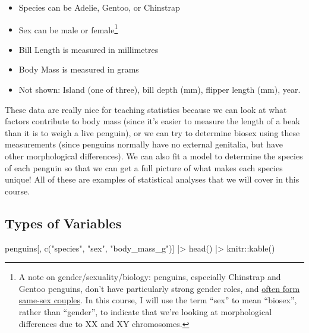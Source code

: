 \documentclass[
  letterpaper,
  DIV=11,
  numbers=noendperiod]{scrreprt}
\newenvironment{Shaded}{\begin{snugshade}}{\end{snugshade}}
\newcommand{\FunctionTok}[1]{\textcolor[rgb]{0.28,0.35,0.67}{#1}}
\newcommand{\NormalTok}[1]{\textcolor[rgb]{0.00,0.23,0.31}{#1}}
\newcommand{\SpecialCharTok}[1]{\textcolor[rgb]{0.37,0.37,0.37}{#1}}
\newcommand{\StringTok}[1]{\textcolor[rgb]{0.13,0.47,0.30}{#1}}
\providecommand{\tightlist}{%
  \setlength{\itemsep}{0pt}\setlength{\parskip}{0pt}}\usepackage{longtable,booktabs,array}
\begin{document}
\begin{itemize}
\tightlist
\item
  Species can be Adelie, Gentoo, or Chinstrap
\item
  Sex can be male or female\footnote{A note on gender/sexuality/biology:
    penguins, especially Chinstrap and Gentoo penguins, don't have
    particularly strong gender roles, and
    \href{https://sites.tufts.edu/museumstudents/2021/02/22/whats-with-all-the-gay-penguins/}{often
    form same-sex couples}. In this course, I will use the term ``sex''
    to mean ``biosex'', rather than ``gender'', to indicate that we're
    looking at morphological differences due to XX and XY chromosomes.}
\item
  Bill Length is measured in millimetres
\item
  Body Mass is measured in grams
\item
  Not shown: Island (one of three), bill depth (mm), flipper length
  (mm), year.
\end{itemize}

These data are really nice for teaching statistics because we can look
at what factors contribute to body mass (since it's easier to measure
the length of a beak than it is to weigh a live penguin), or we can try
to determine biosex using these measurements (since penguins normally
have no external genitalia, but have other morphological differences).
We can also fit a model to determine the species of each penguin so that
we can get a full picture of what makes each species unique! All of
these are examples of statistical analyses that we will cover in this
course.

\hypertarget{types-of-variables}{%
\subsection{Types of Variables}\label{types-of-variables}}

\begin{Shaded}
\begin{Highlighting}[]
\NormalTok{penguins[, }\FunctionTok{c}\NormalTok{(}\StringTok{"species"}\NormalTok{, }\StringTok{"sex"}\NormalTok{, }\StringTok{"body\_mass\_g"}\NormalTok{)] }\SpecialCharTok{|\textgreater{}}
    \FunctionTok{head}\NormalTok{() }\SpecialCharTok{|\textgreater{}}
\NormalTok{    knitr}\SpecialCharTok{::}\FunctionTok{kable}\NormalTok{()}
\end{Highlighting}
\end{Shaded}
\end{document}
